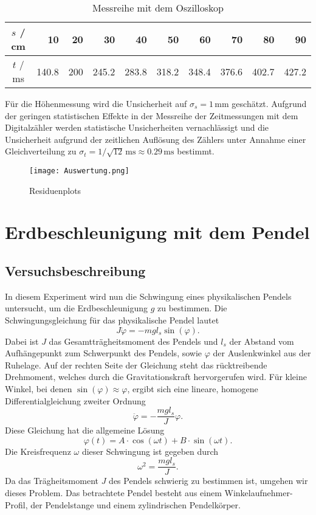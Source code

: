 \documentclass[a4paper, 12pt]{scrartcl}
\begin{document}
\begin{table}[h]
\begin{center}
\begin{tabular}{c|r|r|r|r|r|r|r|r|r}
$s$ / cm & 10 & 20 & 30 & 40 & 50 & 60 & 70 & 80 & 90 \\
\hline
$t$ / ms & 140.8 & 200 & 245.2 & 283.8 & 318.2 & 348.4 & 376.6 & 402.7 & 427.2 \\
\end{tabular}
\caption{Messreihe mit dem Oszilloskop}
\end{center}
\end{table}

Für die Höhenmessung wird die Unsicherheit auf $\sigma_s = 1 \, \mathrm{mm}$ geschätzt. Aufgrund der geringen statistischen Effekte in der Messreihe der Zeitmessungen mit dem Digitalzähler werden statistische Unsicherheiten vernachlässigt und die Unsicherheit aufgrund der zeitlichen Auflösung des Zählers unter Annahme einer Gleichverteilung zu $\sigma_t = 1/\sqrt{12} \, \mathrm{ms} \approx 0.29 \, \mathrm{ms}$ bestimmt.


\begin{figure}[h]
	\centering
	\texttt{[image: Auswertung.png]}
	\caption{Residuenplots}
\end{figure}




\section{Erdbeschleunigung mit dem Pendel}


\subsection{Versuchsbeschreibung}

In diesem Experiment wird nun die Schwingung eines physikalischen Pendels untersucht, um die Erdbeschleunigung $g$ zu bestimmen. Die Schwingungsgleichung für das physikalische Pendel lautet
$$J \ddot \varphi = - mgl_s \sin(\varphi).$$
Dabei ist $J$ das Gesamtträgheitsmoment des Pendels und $l_s$ der Abstand vom Aufhängepunkt zum Schwerpunkt des Pendels, sowie $\varphi$ der Auslenkwinkel aus der Ruhelage. Auf der rechten Seite der Gleichung steht das rücktreibende Drehmoment, welches durch die Gravitationskraft hervorgerufen wird. Für kleine Winkel, bei denen $\sin(\varphi) \approx \varphi$, ergibt sich eine lineare, homogene Differentialgleichung zweiter Ordnung
$$\ddot \varphi = -\frac{mgl_s}J \varphi.$$
Diese Gleichung hat die allgemeine Lösung
$$\varphi(t) = A\cdot \cos(\omega t)+ B\cdot \sin(\omega t).$$
Die Kreisfrequenz $\omega$ dieser Schwingung ist gegeben durch
$$\omega^2 = \frac{mgl_s}J.$$
Da das Trägheitsmoment $J$ des Pendels schwierig zu bestimmen ist, umgehen wir dieses Problem. Das betrachtete Pendel besteht aus einem Winkelaufnehmer-Profil, der Pendelstange und einem zylindrischen Pendelkörper.
\end{document}
